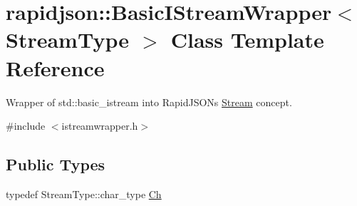 \hypertarget{classrapidjson_1_1_basic_i_stream_wrapper}{}\section{rapidjson\+::Basic\+I\+Stream\+Wrapper$<$ Stream\+Type $>$ Class Template Reference}
\label{classrapidjson_1_1_basic_i_stream_wrapper}


Wrapper of {\ttfamily std\+::basic\+\_\+istream} into Rapid\+J\+S\+ON\textquotesingle{}s \mbox{\hyperlink{classrapidjson_1_1_stream}{Stream}} concept.  




{\ttfamily \#include $<$istreamwrapper.\+h$>$}

\subsection*{Public Types}
\begin{DoxyCompactItemize}
\item 
typedef Stream\+Type\+::char\+\_\+type \mbox{\hyperlink{classrapidjson_1_1_basic_i_stream_wrapper_a5fd972d8cd20b90ba0772aeebf122597}{Ch}}
\end{DoxyCompactItemize}
